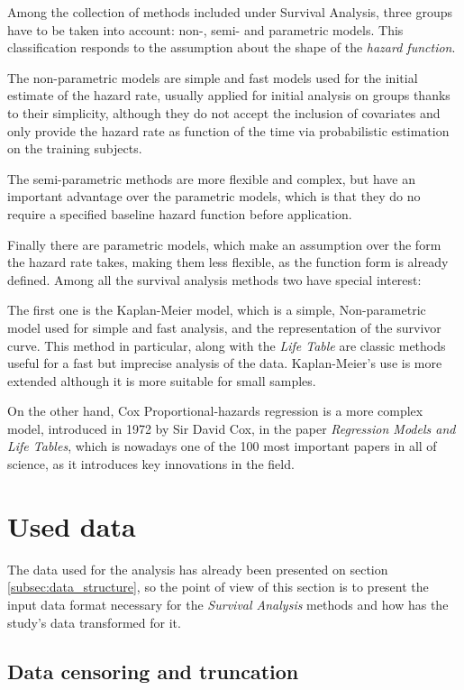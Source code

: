 \documentclass[11pt]{book} %
\begin{document}
    Among the collection of methods included under Survival Analysis, three groups have to be taken into account: non-, semi- and parametric models. This classification responds to the assumption about the shape of the \emph{hazard function}.

    The non-parametric models are simple and fast models used for the initial estimate of the hazard rate, usually applied for initial analysis on groups thanks to their simplicity, although they do not accept the inclusion of covariates and only provide the hazard rate as function of the time via probabilistic estimation on the training subjects.

    The semi-parametric methods are more flexible and complex, but have an important advantage over the parametric models, which is that they do no require a specified baseline hazard function before application.

    Finally there are parametric models, which make an assumption over the form the hazard rate takes, making them less flexible, as the function form is already defined. Among all the survival analysis methods two have special interest:

    The first one is the Kaplan-Meier model, which is a simple, Non-parametric model used for simple and fast analysis, and the representation of the survivor curve. This method in particular, along with the \emph{Life Table} are classic methods useful for a fast but imprecise analysis of the data. Kaplan-Meier's use is more extended although it is more suitable for small samples.

    On the other hand, Cox Proportional-hazards regression is a more complex model, introduced in 1972 by Sir David Cox, in the paper \emph{Regression Models and Life Tables}, which is nowadays one of the 100 most important papers in all of science, as it introduces key innovations in the field.

  \section{Used data}

    The data used for the analysis has already been presented on section \ref{subsec:data_structure}, so the point of view of this section is to present the input data format necessary for the \emph{Survival Analysis} methods and how has the study's data transformed for it.

    \subsection{Data censoring and truncation}
      \label{subsubsec:censoring}
\end{document}
